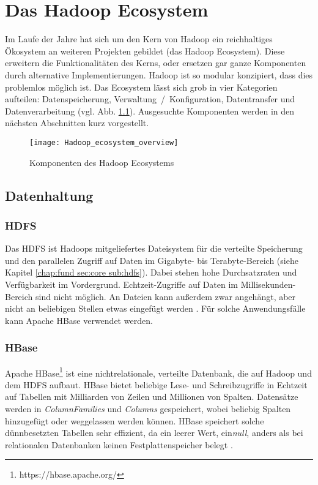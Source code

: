 \chapter{Das Hadoop Ecosystem}
Im Laufe der Jahre hat sich um den Kern von Hadoop ein reichhaltiges Ökosystem an weiteren Projekten gebildet (das Hadoop Ecosystem). Diese erweitern die Funktionalitäten des Kerns, oder ersetzen gar ganze Komponenten durch alternative Implementierungen. Hadoop ist so modular konzipiert, dass dies problemlos möglich ist. Das Ecosystem lässt sich grob in vier Kategorien aufteilen: Datenspeicherung, Verwaltung~/~Konfiguration, Datentransfer und Datenverarbeitung (vgl. Abb. \ref{fig:ecosys}). Ausgesuchte Komponenten werden in den nächsten Abschnitten kurz vorgestellt.

\begin{figure}[ht]
    \centering
    \texttt{[image: Hadoop\_ecosystem\_overview]}
    \caption[Komponenten des Hadoop Ecosystems]{Komponenten des Hadoop Ecosystems\parencite{van_der_weel_hadoop_2015}}
    \label{fig:ecosys}
\end{figure}

\section{Datenhaltung}
\subsection{HDFS}
Das HDFS ist Hadoops mitgeliefertes Dateisystem für die verteilte Speicherung und den parallelen Zugriff auf Daten im Gigabyte- bis Terabyte-Bereich (siehe Kapitel \ref{chap:fund sec:core sub:hdfs}). Dabei stehen hohe Durchsatzraten und Verfügbarkeit im Vordergrund. Echtzeit-Zugriffe auf Daten im Millisekunden-Bereich sind nicht möglich. An Dateien kann außerdem zwar angehängt, aber nicht an beliebigen Stellen etwas eingefügt werden \parencite[vgl.][Kapitel 3]{white_hadoop_2015}. Für solche Anwendungsfälle kann Apache HBase verwendet werden. 
\subsection{HBase}
Apache HBase\footnote{https://hbase.apache.org/} ist eine nichtrelationale, verteilte Datenbank, die auf Hadoop und dem HDFS aufbaut. HBase bietet beliebige Lese- und Schreibzugriffe in Echtzeit auf Tabellen mit Milliarden von Zeilen und Millionen von Spalten. Datensätze werden in \textit{ColumnFamilies} und \textit{Columns} gespeichert, wobei beliebig Spalten hinzugefügt oder weggelassen werden können. HBase speichert solche dünnbesetzten Tabellen sehr effizient, da ein leerer Wert, ein\textit{null}, anders als bei relationalen Datenbanken keinen Festplattenspeicher belegt \parencite[vgl.][Abschnitt 21]{hbase_team_apache_2022}.  

